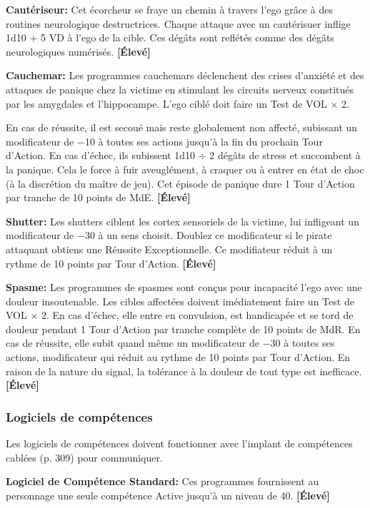 \textbf{Cautériseur:} Cet écorcheur se fraye un chemin à travers l'ego grâce à des routines neurologique destructrices. Chaque attaque avec un cautérisuer inflige 1d10 + 5 VD à l'ego de la cible. Ces dégâts sont reflétés comme des dégâts neurologiques numérisés. \textbf{[Élevé]} 

\textbf{Cauchemar:} Les programmes cauchemars déclenchent des crises d'anxiété et des attaques de panique chez la victime en stimulant les circuits nerveux constitués par les amygdales et l'hippocampe. L'ego ciblé doit faire un Test de VOL $\times$ 2. 

En cas de réussite, il est secoué mais reste globalement non affecté, subissant un modificateur de $-$10 à toutes ses actions jusqu'à la fin du prochain Tour d'Action. En cas d'échec, ils subissent 1d10 $\div$ 2 dégâts de stress et succombent à la panique. Cela le force à fuir aveuglément, à craquer ou à entrer en état de choc (à la discrétion du maître de jeu). Cet épisode de panique dure 1 Tour d'Action par tranche de 10 points de MdE. \textbf{[Élevé]} 

\textbf{Shutter:} Les shutters ciblent les cortex sensoriels de la victime, lui infligeant un modificateur de $-$30 à un sens choisit. Doublez ce modificateur si le pirate attaquant obtiens une Réussite Exceptionnelle. Ce modifiateur réduit à un rythme de 10 points par Tour d'Action. \textbf{[Élevé]} 

\textbf{Spasme:} Les programmes de spasmes sont conçus pour incapacité l'ego avec une douleur insoutenable. Les cibles affectées doivent imédiatement faire un Test de VOL $\times$ 2. En cas d'échec, elle entre en convulsion, est handicapée et se tord de douleur pendant 1 Tour d'Action par tranche complète de 10 points de MdR. En cas de réussite, elle subit quand même un modificateur de $-$30 à toutes ses actions, modificateur qui réduit au rythme de 10 points par Tour d'Action. En raison de la nature du signal, la tolérance à la douleur de tout type est inefficace. \textbf{[Élevé]} 

\subsubsection{Logiciels de compétences} 

Les logiciels de compétences doivent fonctionner avec l'implant de compétences cablées (p. 309) pour communiquer. 

\textbf{Logiciel de Compétence Standard:} Ces programmes fournissent au personnage une seule compétence Active jusqu'à un niveau de 40. \textbf{[Élevé]} 

